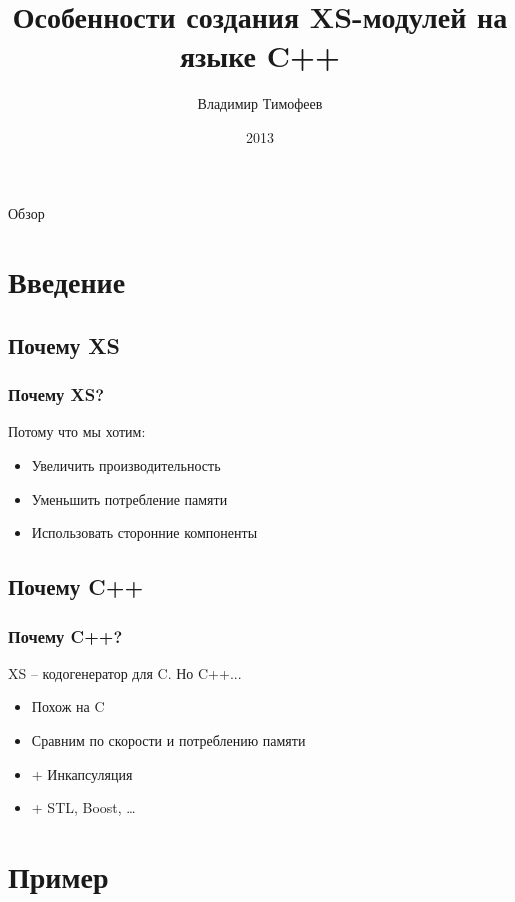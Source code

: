 \documentclass[utf8x,smaller]{beamer}
\title{Особенности создания XS-модулей на языке C++}
\author{Владимир Тимофеев}
\date{2013}
\begin{document}
\begin{frame}
    \titlepage
\end{frame}

\begin{frame}{Обзор}
    \tableofcontents
\end{frame}

\section{Введение}

\subsection{Почему XS}

\begin{frame}
    \frametitle{Почему XS?}
    Потому что мы хотим:
    \begin{itemize}[<+->]
        \item Увеличить производительность
        \item Уменьшить потребление памяти
        \item Использовать сторонние компоненты
    \end{itemize}
\end{frame}

\subsection{Почему C++}

\begin{frame}
    \frametitle{Почему C++?}
    XS -- кодогенератор для C. Но C++...
    \begin{itemize}[<+->]
        \item Похож на C
        \item Сравним по скорости и потреблению памяти
        \item + Инкапсуляция
        \item + STL, Boost, \dots
    \end{itemize}
\end{frame}

\section{Пример}
\end{document}

